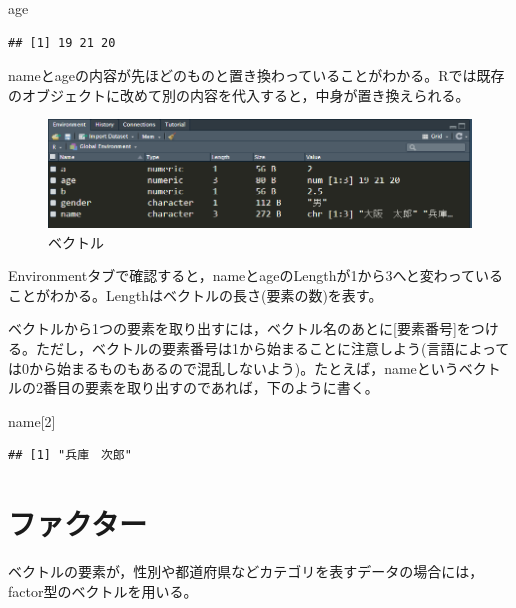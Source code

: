 \documentclass[
]{book}
\newenvironment{Shaded}{\begin{snugshade}}{\end{snugshade}}
\newcommand{\DecValTok}[1]{\textcolor[rgb]{0.00,0.00,0.81}{#1}}
\newcommand{\NormalTok}[1]{#1}
\begin{document}
\begin{Shaded}
\begin{Highlighting}[]
\NormalTok{age}
\end{Highlighting}
\end{Shaded}

\begin{verbatim}
## [1] 19 21 20
\end{verbatim}

nameとageの内容が先ほどのものと置き換わっていることがわかる。Rでは既存のオブジェクトに改めて別の内容を代入すると，中身が置き換えられる。

\begin{figure}
\centering
\includegraphics{vector.png}
\caption{ベクトル}
\end{figure}

Environmentタブで確認すると，nameとageのLengthが1から3へと変わっていることがわかる。Lengthはベクトルの長さ(要素の数)を表す。

ベクトルから1つの要素を取り出すには，ベクトル名のあとに{[}要素番号{]}をつける。ただし，ベクトルの要素番号は1から始まることに注意しよう(言語によっては0から始まるものもあるので混乱しないよう)。たとえば，nameというベクトルの2番目の要素を取り出すのであれば，下のように書く。

\begin{Shaded}
\begin{Highlighting}[]
\NormalTok{name[}\DecValTok{2}\NormalTok{]}
\end{Highlighting}
\end{Shaded}

\begin{verbatim}
## [1] "兵庫　次郎"
\end{verbatim}

\hypertarget{ux30d5ux30a1ux30afux30bfux30fc}{%
\section{ファクター}\label{ux30d5ux30a1ux30afux30bfux30fc}}

ベクトルの要素が，性別や都道府県などカテゴリを表すデータの場合には，factor型のベクトルを用いる。
\end{document}
